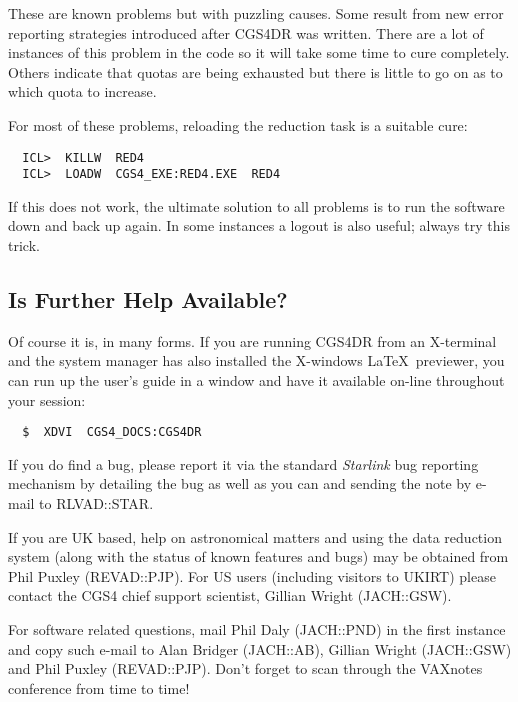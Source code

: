{These are known problems but with puzzling causes. Some result from new error 
reporting strategies introduced after CGS4DR was written. There are a lot of 
instances of this problem in the code so it will take some time to cure 
completely. Others indicate that quotas are being exhausted but there is
little to go on as to which quota to increase.

For most of these problems, reloading the reduction task is a suitable cure:

\begin{verbatim}
  ICL>  KILLW  RED4
  ICL>  LOADW  CGS4_EXE:RED4.EXE  RED4
\end{verbatim}

If this does not work, the ultimate solution to all problems is to run the 
software down and back up again. In some instances a logout is also useful; 
always try this trick.

\subsection{Is Further Help Available?}
\label{is_further_help_available}

Of course it is, in many forms. If you are running CGS4DR from an X-terminal
and the system manager has also installed the X-windows \LaTeX\ previewer,
you can run up the user's guide in a window and have it available on-line
throughout your session:

\begin{verbatim}
  $  XDVI  CGS4_DOCS:CGS4DR
\end{verbatim}

If you do find a bug, please report it via the standard
{\sl Starlink} bug reporting mechanism by detailing the bug as well as you
can and sending the note by e-mail to {\sf RLVAD::STAR}.

If you are UK based, help on astronomical matters and using the data reduction
system (along with the status of known features and bugs) may be obtained from 
Phil Puxley ({\sf REVAD::PJP}). For US users (including visitors to UKIRT)
please contact the CGS4 chief support scientist, Gillian Wright 
({\sf JACH::GSW}).

For software related questions, mail Phil Daly ({\sf JACH::PND}) in the first
instance and copy such e-mail to Alan Bridger ({\sf JACH::AB}), Gillian
Wright ({\sf JACH::GSW}) and Phil Puxley ({\sf REVAD::PJP}). Don't forget
to scan through the VAXnotes conference from time to time!

\newpage
\markright{\stardocname}
}
